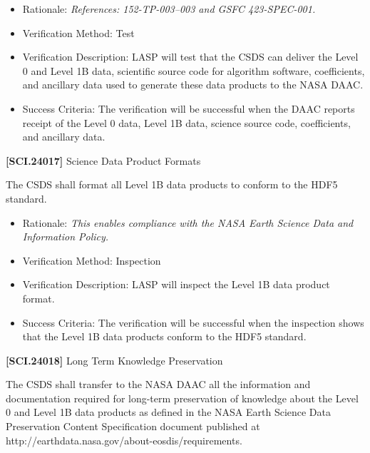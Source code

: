 \documentclass[12pt,oneside,oldfontcommands]{memoir}
\begin{document}
\begin{itemize}
\item{} Rationale: \emph{References: 152-TP-003--003 and GSFC 423-SPEC-001.}

\item{} Verification Method: Test

\item{} Verification Description: \gls{LASP} will \gls{test} that the \gls{CSDS} can deliver the Level 0 and Level 1B data, scientific source code for algorithm software, coefficients, and ancillary data used to generate these data products to the NASA \gls{DAAC}.

\item{} Success Criteria: The verification will be successful when the \gls{DAAC} reports receipt of the Level 0 data, Level 1B data, science source code, coefficients, and ancillary data.

\end{itemize}

\textbf{[SCI.24017]} Science Data Product Formats

The \gls{CSDS} shall format all Level 1B data products to conform to the HDF5 standard.

\begin{itemize}
\item{} Rationale: \emph{This enables compliance with the NASA Earth Science Data and Information Policy.}

\item{} Verification Method: Inspection

\item{} Verification Description: \gls{LASP} will inspect the Level 1B data product format.

\item{} Success Criteria: The verification will be successful when the \gls{inspection} shows that the Level 1B data products conform to the HDF5 standard.

\end{itemize}

\textbf{[SCI.24018]} Long Term Knowledge Preservation

The \gls{CSDS} shall transfer to the NASA \gls{DAAC} all the information and documentation required for long-term preservation of knowledge about the Level 0 and Level 1B data products as defined in the NASA Earth Science Data Preservation Content Specification document published at http:\slash \slash earthdata.nasa.gov\slash about-eosdis\slash requirements.
\end{document}
